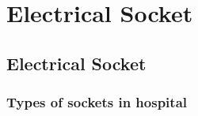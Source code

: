 \documentclass[12pt,fleqn]{book} %
\begin{document}
\part {Electrical Socket}

\chapter{Electrical Socket}

\section {Types of sockets in hospital}
\end{document}
